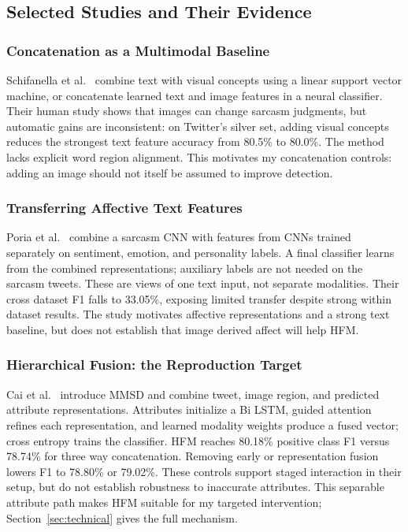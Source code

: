 \documentclass[conference]{IEEEtran}
\begin{document}
\subsection{Selected Studies and Their Evidence}
\subsubsection{Concatenation as a Multimodal Baseline}
Schifanella et al.~\cite{schifanella2016} combine text with visual concepts using a linear support vector machine, or concatenate learned text and image features in a neural classifier. Their human study shows that images can change sarcasm judgments, but automatic gains are inconsistent: on Twitter's silver set, adding visual concepts reduces the strongest text feature accuracy from 80.5\% to 80.0\%. The method lacks explicit word region alignment. This motivates my concatenation controls: adding an image should not itself be assumed to improve detection.

\subsubsection{Transferring Affective Text Features}
Poria et al.~\cite{poria2016} combine a sarcasm CNN with features from CNNs trained separately on sentiment, emotion, and personality labels. A final classifier learns from the combined representations; auxiliary labels are not needed on the sarcasm tweets. These are views of one text input, not separate modalities. Their cross dataset F1 falls to 33.05\%, exposing limited transfer despite strong within dataset results. The study motivates affective representations and a strong text baseline, but does not establish that image derived affect will help HFM.

\subsubsection{Hierarchical Fusion: the Reproduction Target}
Cai et al.~\cite{cai2019} introduce MMSD and combine tweet, image region, and predicted attribute representations. Attributes initialize a Bi LSTM, guided attention refines each representation, and learned modality weights produce a fused vector; cross entropy trains the classifier. HFM reaches 80.18\% positive class F1 versus 78.74\% for three way concatenation. Removing early or representation fusion lowers F1 to 78.80\% or 79.02\%. These controls support staged interaction in their setup, but do not establish robustness to inaccurate attributes. This separable attribute path makes HFM suitable for my targeted intervention; Section~\ref{sec:technical} gives the full mechanism.
\end{document}
